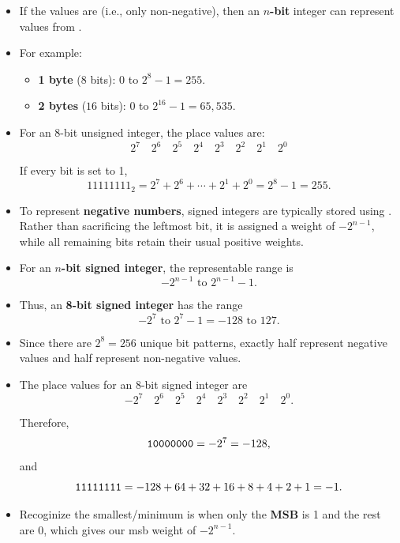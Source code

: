 \documentclass[10pt]{article}
\newcommand{\pbreak}{\vspace{30pt}}
\newcommand{\vocab}[1]{\fbox{\textbf{\textit{#1}}}}
\begin{document}
\pbreak

\begin{itemize}
	\item If the values are \vocab{unsigned} (i.e., only non-negative), then an \textbf{\(n\)-bit} integer can represent values from .

    \item For example:
    \begin{itemize}
        \item \textbf{1 byte} ($8$ bits): $0$ to $2^8 - 1 = 255$.
        \item \textbf{2 bytes} ($16$ bits): $0$ to $2^{16} - 1 = 65,\!535$.
    \end{itemize}

    \item For an 8-bit unsigned integer, the place values are:
    \[
        2^7 \quad 2^6 \quad 2^5 \quad 2^4 \quad 2^3 \quad 2^2 \quad 2^1 \quad 2^0
    \]

    If every bit is set to 1,
    \[
        11111111_2 = 2^7 + 2^6 + \cdots + 2^1 + 2^0 = 2^8 - 1 = 255.
    \]
\end{itemize}

\pbreak

\begin{itemize}
    \item To represent \textbf{negative numbers}, signed integers are typically stored using \vocab{two's complement}. Rather than sacrificing the leftmost bit, it is assigned a weight of $-2^{n-1}$, while all remaining bits retain their usual positive weights.

    \item For an \textbf{\(n\)-bit signed integer}, the representable range is
    \[
        -2^{n-1} \text{ to } 2^{n-1} - 1.
    \]

    \item Thus, an \textbf{8-bit signed integer} has the range
    \[
        -2^7 \text{ to } 2^7 - 1 = -128 \text{ to } 127.
    \]

    \item Since there are $2^8 = 256$ unique bit patterns, exactly half represent negative values and half represent non-negative values.

    \item The place values for an 8-bit signed integer are
    \[
        -2^7 \quad 2^6 \quad 2^5 \quad 2^4 \quad 2^3 \quad 2^2 \quad 2^1 \quad 2^0.
    \]

    Therefore,
    \[
        \verb|10000000| = -2^7 = -128,
    \]
    and
    \[
        \verb|11111111| = -128 + 64 + 32 + 16 + 8 + 4 + 2 + 1 = -1.
    \]

\item Recoginize the smallest/minimum is when only the \textbf{MSB} is 1 and the rest are 0, which gives our msb weight of $-2^{n-1}$.
\end{itemize}
\end{document}
